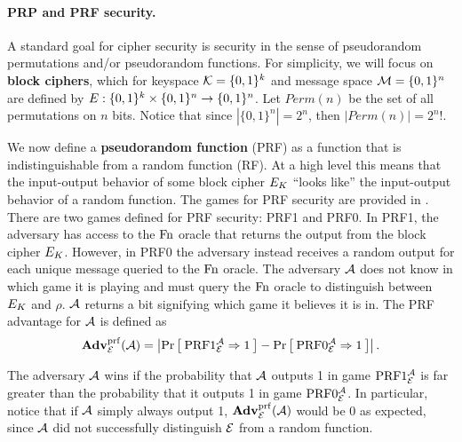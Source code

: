 \paragraph{PRP and PRF security.} A standard goal for cipher security is security in the sense of pseudorandom permutations and/or pseudorandom functions. For simplicity, we will focus on \textbf{block ciphers}, which for keyspace ${\cal K}=\{0,1\}^k$ and message space ${\cal M}=\{0,1\}^n$ are defined by $E : \{0,1\}^k \times \{0,1\}^n \to \{0,1\}^n$. Let $Perm(n)$ be the set of all permutations on $n$ bits. Notice that since $|\{0,1\}^n| = 2^n$, then $|Perm(n)| = 2^n!$. %

We now define a \textbf{pseudorandom function} (PRF) as a function that is indistinguishable from a random function (RF). At a high level this means that the input-output behavior of some block cipher $E_K$ ``looks like'' the input-output behavior of a random function. The games for PRF security are provided in . There are two games defined for PRF security: PRF1 and PRF0. In PRF1, the adversary has access to the $\textnormal{Fn}$ oracle that returns the output from the block cipher $E_K$. However, in PRF0 the adversary instead receives a random output for each unique message queried to the $\textnormal{Fn}$ oracle. The adversary ${\mathcal A}$ does not know in which game it is playing and must query the $\textnormal{Fn}$ oracle to distinguish between $E_K$ and $\rho$. ${\mathcal A}$ returns a bit signifying which game it believes it is in. The PRF advantage for ${\mathcal A}$ is defined as 
\begin{equation*}
\mathbf{Adv}^{\mathrm{prf}}_{{\cal E}}({\mathcal A}) = \left| \Pr\left[\: \textnormal{PRF}1_{\cal E}^{\mathcal A}\Rightarrow 1 \:\right] 
- \Pr\left[\: \textnormal{PRF}0_{\cal E}^{\mathcal A}\Rightarrow1 \:\right] \right|.
\end{equation*}

The adversary ${\mathcal A}$ wins if the probability that ${\mathcal A}$ outputs 1 in game $\textnormal{PRF}1_{\cal E}^{\mathcal A}$ is far greater than the probability that it outputs 1 in game $\textnormal{PRF}0_{\cal E}^{\mathcal A}$. In particular, notice that if ${\mathcal A}$ simply always output 1, $\mathbf{Adv}^{\mathrm{prf}}_{{\cal E}}({\mathcal A})$ would be 0 as expected, since ${\mathcal A}$ did not successfully distinguish ${\cal E}$ from a random function. 


